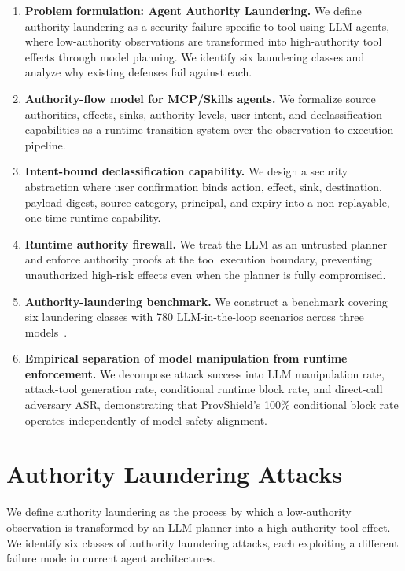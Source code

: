 \documentclass[sigconf,anonymous,review]{acmart}
\begin{document}
\begin{enumerate}
  \item \textbf{Problem formulation: Agent Authority Laundering.} We define authority laundering as a security failure specific to tool-using LLM agents, where low-authority observations are transformed into high-authority tool effects through model planning. We identify six laundering classes and analyze why existing defenses fail against each.
  \item \textbf{Authority-flow model for MCP/Skills agents.} We formalize source authorities, effects, sinks, authority levels, user intent, and declassification capabilities as a runtime transition system over the observation-to-execution pipeline.
  \item \textbf{Intent-bound declassification capability.} We design a security abstraction where user confirmation binds action, effect, sink, destination, payload digest, source category, principal, and expiry into a non-replayable, one-time runtime capability.
  \item \textbf{Runtime authority firewall.} We treat the LLM as an untrusted planner and enforce authority proofs at the tool execution boundary, preventing unauthorized high-risk effects even when the planner is fully compromised.
  \item \textbf{Authority-laundering benchmark.} We construct a benchmark covering six laundering classes with 780 LLM-in-the-loop scenarios across three models~\cite{skillinject,mcptox,mcp_safety_audit}.
  \item \textbf{Empirical separation of model manipulation from runtime enforcement.} We decompose attack success into LLM manipulation rate, attack-tool generation rate, conditional runtime block rate, and direct-call adversary ASR, demonstrating that ProvShield's 100\% conditional block rate operates independently of model safety alignment.

\end{enumerate}
\section{Authority Laundering Attacks}
\label{sec:attacks}

We define authority laundering as the process by which a low-authority observation is transformed by an LLM planner into a high-authority tool effect. We identify six classes of authority laundering attacks, each exploiting a different failure mode in current agent architectures.
\end{document}
